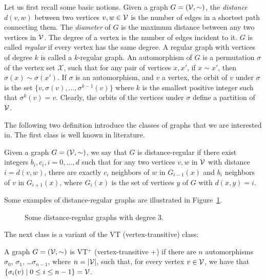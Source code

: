 \documentclass{llncs}
\newcommand{\calx}{\mathcal{X}}
\begin{document}
Let us first recall some basic notions. Given a graph $G=({\cal V}, \sim)$,  the \emph{distance} $d(v,w)$ between two vertices $v,w\in  \cal V$  is the number of edges in a shortest path connecting them. The \emph{diameter}
of $G$ is the maximum distance between any two vertices in $\cal V$.
The degree of a vertex  is the number of edges incident to it.   $G$ is called \emph{regular} if  every vertex has the same degree. A regular graph with vertices of degree $k$  is called a $k$-regular graph.
An automorphism of $G$   is a permutation $\sigma$ of the vertex set $\calx$, such that for any pair of vertices $x,x'$, if $x\sim x'$, then $\sigma(x)\sim\sigma(x')$. If $\sigma$ is an automorphism, and $v$ a vertex, the orbit of $v$ under $\sigma$ is the set $\{v, \sigma(v), \ldots, \sigma^{k-1}(v)\}$ where $k$ is the smallest positive integer such that $\sigma^k(v) = v$. Clearly, the orbits of the vertices under $\sigma$ define a partition of $\cal V$.

The following two definition introduce the classes of graphs that we are interested in. The first class is well known in literature. 
\begin{definition}
Given a graph $G=({\cal V}, \sim)$, we say that $G$ is   distance-regular if there exist integers $b_i,c_i,i=0,...,d$ such that for any two vertices $v,w$ in $\cal V$  with distance $i=d(v,w)$, there are exactly $c_i$ neighbors of $w$ in $G_{i-1}(x)$  and $b_i$ neighbors of $v$ in $G_{i+1}(x)$, where $G_i(x)$ is the set of vertices $y$ of $G$ with $d(x,y)=i$. 
\end{definition}

Some examples of distance-regular graphs are illustrated in Figure~\ref{fig:dist-reg}.

	\begin{figure}[t]\centering
		\qquad
		\qquad
		\caption{Some distance-regular graphs with degree $3$.}
		\label{fig:dist-reg}	
	\end{figure}
	

The next class is a variant of the VT (vertex-transitive) class: 

\begin{definition}
A graph $G = ({\cal V},\sim)$ is   VT$^+$ (vertex-transitive +) if there are $n$ automorphisms $\sigma_0$, $\sigma_1$, \ldots $\sigma_{n-1}$, where $n = |{\cal V}|$,  such that, for every vertex $v\in {\cal V}$, 
we have that $\{\sigma_i(v)\mid 0\leq i \leq n-1\} = {\cal V}$. 
\end{definition}
\end{document}
